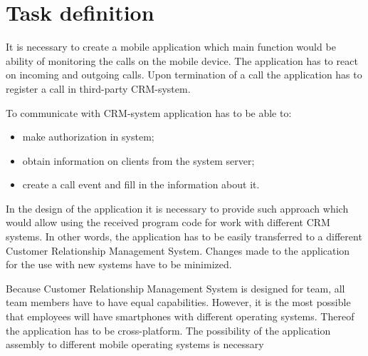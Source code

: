 \section{Task definition}\label{sec:definition}

It is necessary to create a mobile application which main function would be ability of monitoring the calls on the mobile device. The application has to react on incoming and outgoing calls. Upon termination of a call the application has to register a call in third-party CRM-system.

To communicate with CRM-system  application has to be able to:

\begin {itemize}
\item make authorization in system;
\item obtain information on clients from the system server;
\item create a call event and fill in the information about it.
\end {itemize}

In the design of the application it is necessary to provide such approach which would allow using the received program code for work with different CRM systems. In other words, the application has to be easily transferred to a different Customer Relationship Management System. Changes made to the application for the use with new systems have to be minimized.

Because Customer Relationship Management System is designed for team, all team members have to have equal capabilities. However, it is the most possible that employees will have smartphones with different operating systems. Thereof the application has to be cross-platform. The possibility of the application assembly to different mobile operating systems is necessary
